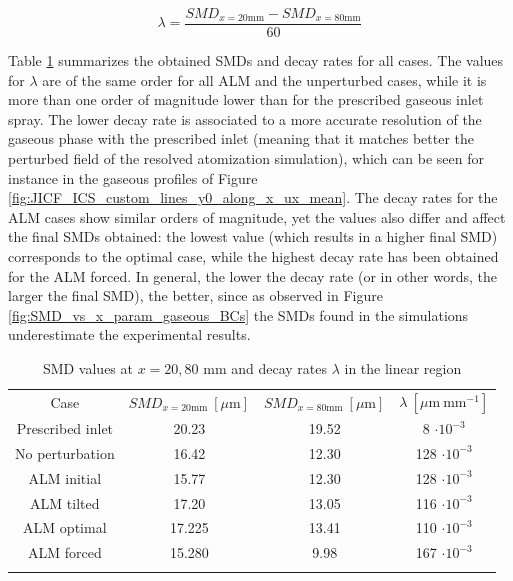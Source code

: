 \begin{equation}
\lambda = \frac{SMD_{x=20\mathrm{mm}} -  SMD_{x=80\mathrm{mm}}}{60}
\end{equation} 

Table \ref{tab:SMD_decay_rates} summarizes the obtained SMDs and decay rates for all cases. The values for $\lambda$ are of the same order for all ALM and the unperturbed cases, while it is more than one order of magnitude lower than for the prescribed gaseous inlet spray. The lower decay rate is associated to a more accurate resolution of the gaseous phase with the prescribed inlet (meaning that it matches better the perturbed field of the resolved atomization simulation), which can be seen for instance in the gaseous profiles of Figure \ref{fig:JICF_ICS_custom_lines_y0_along_x_ux_mean}. The decay rates for the ALM cases show similar orders of magnitude, yet the values also differ and affect the final SMDs obtained: the lowest value (which results in a higher final SMD) corresponds to the optimal case, while the highest decay rate has been obtained for the ALM forced. In general, the lower the decay rate (or in other words, the larger the final SMD), the better, since as observed in Figure \ref{fig:SMD_vs_x_param_gaseous_BCs} the SMDs found in the simulations underestimate the experimental results.

\clearpage 

\begin{table}[!h]
\centering
\caption{SMD values at $x = 20, 80$ mm and decay rates $\lambda$ in the linear region}
\begin{tabular}{cccc}
\thickhline
Case & $SMD_{x=20\mathrm{mm}}~\left[\mu \mathrm{m} \right]$ & $SMD_{x=80\mathrm{mm}}~\left[\mu \mathrm{m} \right]$ & $\lambda~\left[\mu \mathrm{m} ~ \mathrm{mm}^{-1} \right]$ \\
\thickhline
Prescribed inlet & 20.23 & 19.52 & 8 $\cdot 10^{-3}$ \\
No perturbation & 16.42 & 12.30 & 128 $\cdot 10^{-3}$\\
ALM initial & 15.77 & 12.30 & 128 $\cdot 10^{-3}$ \\
ALM tilted & 17.20 & 13.05 & 116 $\cdot 10^{-3}$ \\
ALM optimal & 17.225 & 13.41 & 110 $\cdot 10^{-3}$ \\
ALM forced & 15.280 & 9.98 & 167 $\cdot 10^{-3}$ \\
\thickhline
\end{tabular}
\label{tab:SMD_decay_rates}
\end{table}



